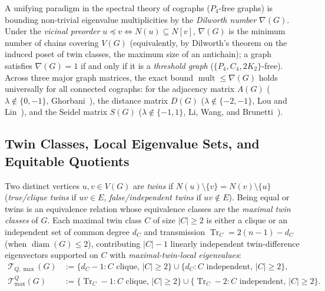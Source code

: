 \documentclass[11pt,a4paper]{article}
\theoremstyle{definition}
\DeclareMathOperator{\Tr}{Tr}
\DeclareMathOperator{\mult}{mult}
\DeclareMathOperator{\diam}{diam}
\begin{document}
A unifying paradigm in the spectral theory of cographs ($P_4$-free graphs) is bounding non-trivial eigenvalue multiplicities by the \emph{Dilworth number} $\nabla(G)$. Under the \emph{vicinal preorder} $u \preceq v \iff N(u) \subseteq N[v]$, $\nabla(G)$ is the minimum number of chains covering $V(G)$ (equivalently, by Dilworth's theorem on the induced poset of twin classes, the maximum size of an antichain); a graph satisfies $\nabla(G) = 1$ if and only if it is a \emph{threshold graph} ($\{P_4, C_4, 2K_2\}$-free). Across three major graph matrices, the exact bound $\mult \le \nabla(G)$ holds universally for all connected cographs: for the adjacency matrix $A(G)$ ($\lambda \notin \{0,-1\}$, Ghorbani~\cite{Ghorbani2019}), the distance matrix $D(G)$ ($\lambda \notin \{-2,-1\}$, Lou and Lin~\cite{LL2021}), and the Seidel matrix $S(G)$ ($\lambda \notin \{-1,1\}$, Li, Wang, and Brunetti~\cite{LWB2024}).

\subsection{Twin Classes, Local Eigenvalue Sets, and Equitable Quotients}

Two distinct vertices $u, v \in V(G)$ are \emph{twins} if $N(u) \setminus \{v\} = N(v) \setminus \{u\}$ (\emph{true/clique twins} if $uv \in E$, \emph{false/independent twins} if $uv \notin E$). Being equal or twins is an equivalence relation whose equivalence classes are the \emph{maximal twin classes} of $G$. Each maximal twin class $C$ of size $|C| \ge 2$ is either a clique or an independent set of common degree $d_C$ and transmission $\Tr_C = 2(n-1)-d_C$ (when $\diam(G) \le 2$), contributing $|C|-1$ linearly independent twin-difference eigenvectors supported on $C$ with \emph{maximal-twin-local eigenvalues}:
\begin{align*}
  \mathcal{T}_{Q,\max}(G) &:= \{d_C - 1 : C\text{ clique},\, |C| \ge 2\} \cup \{d_C : C\text{ independent},\, |C| \ge 2\}, \\
  \mathcal{T}^Q_{\max}(G) &:= \{\Tr_C - 1 : C\text{ clique},\, |C| \ge 2\} \cup \{\Tr_C - 2 : C\text{ independent},\, |C| \ge 2\}.
\end{align*}
\end{document}
